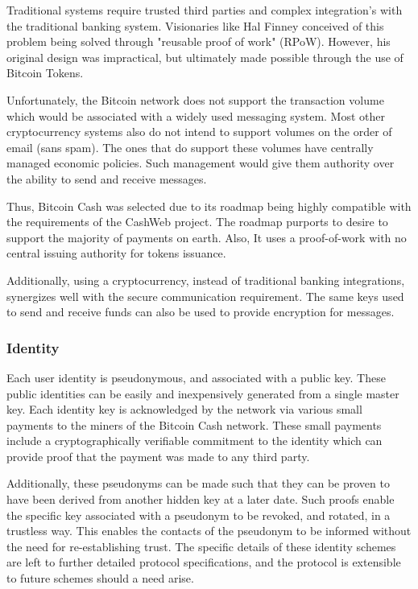 \documentclass{article}
\begin{document}
Traditional systems require trusted third parties and complex integration's with the traditional banking system. Visionaries like Hal Finney conceived of this problem being solved through "reusable proof of work" (RPoW). However, his original design was impractical, but ultimately made possible through the use of Bitcoin Tokens.

Unfortunately, the Bitcoin network does not support the transaction volume which would be associated with a widely used messaging system. Most other cryptocurrency systems also do not intend to support volumes on the order of email (sans spam). The ones that do support these volumes have centrally managed economic policies. Such management would give them authority over the ability to send and receive messages.

Thus, Bitcoin Cash was selected due to its roadmap being highly compatible with the requirements of the CashWeb project. The roadmap purports to desire to support the majority of payments on earth. Also, It uses a proof-of-work with no central issuing authority for tokens issuance.

Additionally, using a cryptocurrency, instead of traditional banking integrations, synergizes well with the secure communication requirement. The same keys used to send and receive funds can also be used to provide encryption for messages.

\subsubsection{Identity}

Each user identity is pseudonymous, and associated with a public key. These public identities can be easily and inexpensively generated from a single master key. Each identity key is acknowledged by the network via various small payments to the miners of the Bitcoin Cash network. These small payments include a cryptographically verifiable commitment to the identity which can provide proof that the payment was made to any third party.

Additionally, these pseudonyms can be made such that they can be proven to have been derived from another hidden key at a later date. Such proofs enable the specific key associated with a pseudonym to be revoked, and rotated, in a trustless way. This enables the contacts of the pseudonym to be informed without the need for re-establishing trust. The specific details of these identity schemes are left to further detailed protocol specifications, and the protocol is extensible to future schemes should a need arise.
\end{document}
